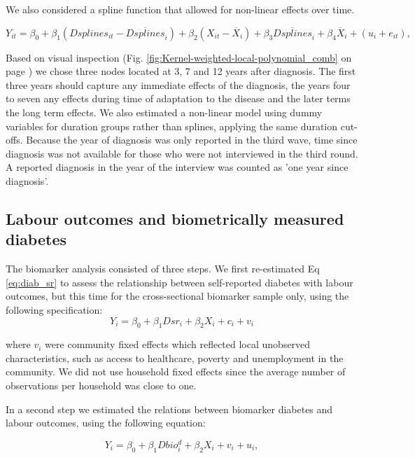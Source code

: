 \documentclass[12pt,english]{article}
\begin{document}
We also considered a spline function that allowed for non-linear effects over time.

\begin{equation}
Y_{it}=\beta_{0}+\beta_{1}(Dsplines_{it}-\overline{Dsplines}_{i})+\beta_{2}(X_{it}-\overline{X}_i)+\beta_{3}\overline{Dsplines}_{i}+\beta_{4}\overline{X}_i+(u_{i}+e_{it}),\label{eq:splines}
\end{equation}

Based on visual inspection (Fig. \ref{fig:Kernel-weighted-local-polynomial_comb} on page \pageref{fig:Kernel-weighted-local-polynomial_comb}) we chose three nodes located at 3, 7 and 12 years after diagnosis. The first three years should capture any immediate effects of the diagnosis, the years four to seven any effects during time of adaptation to the disease and the later terms the long term effects. We also estimated a non-linear model using dummy variables for duration groups rather than splines, applying the same duration cut-offs. Because the year of diagnosis was only reported in the third wave, time since diagnosis was not available for those who were not interviewed in the third round.  A reported diagnosis in the year of the interview was counted as 'one year since diagnosis'.

\subsection{\label{sec:Biomarker Strategy}Labour outcomes and biometrically measured diabetes}

The biomarker analysis consisted of three steps. We first re-estimated Eq \ref{eq:diab_sr} to assess the relationship between self-reported diabetes with labour outcomes, but this time for the cross-sectional biomarker sample only, using the following specification:
\begin{equation}
Y_{i}=\beta_{0}+\beta_{1}Dsr_{i}+\beta_{2}X_{i}+c_{i}+v_{i}\label{eq:diab_sr}
\end{equation}

where $v_{i}$ were community fixed effects which reflected local unobserved characteristics, such as access to healthcare, poverty and unemployment in the community. We did not use household fixed effects since the average number of observations per household was close to one.

In a second step we estimated the relations between biomarker diabetes and labour outcomes, using the following equation:

\begin{equation}
Y_{i}=\beta_{0}+\beta_{1}Dbio^{d}_{i}+\beta_{2}X_{i}+v_{i}+u_{i}\label{eq:diab},
\end{equation}
\end{document}
